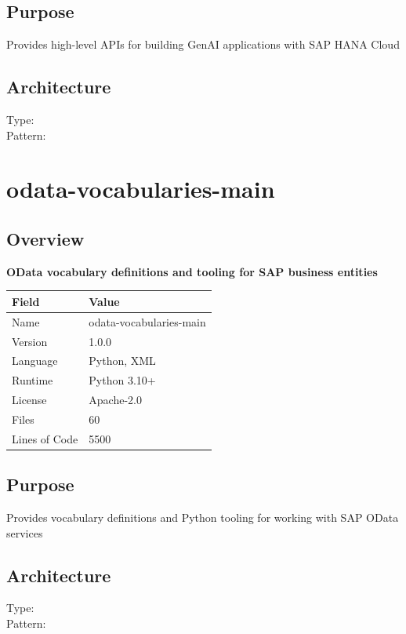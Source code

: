\documentclass[11pt,a4paper]{article}
\begin{document}
\subsection{Purpose}
Provides high-level APIs for building GenAI applications with SAP HANA Cloud

\subsection{Architecture}
Type:  \\
Pattern: 



\newpage


\section{odata-vocabularies-main}

\subsection{Overview}

\textbf{OData vocabulary definitions and tooling for SAP business entities}

\begin{tabular}{@{}ll@{}}
\toprule
\textbf{Field} & \textbf{Value} \\
\midrule
Name & odata-vocabularies-main \\
Version & 1.0.0 \\
Language & Python, XML \\
Runtime & Python 3.10+ \\
License & Apache-2.0 \\
Files & 60 \\
Lines of Code & 5500 \\
\bottomrule
\end{tabular}

\subsection{Purpose}
Provides vocabulary definitions and Python tooling for working with SAP OData services

\subsection{Architecture}
Type:  \\
Pattern: 
\end{document}
